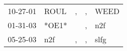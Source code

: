 \begin{supertabular}{lllll}
 10-27-01 &   ROUL &  , &  , &  WEED \\
 01-31-03 &  *OE1* &    &  , &   n2f \\
 05-25-03 &    n2f &  , &  , &  slfg \\
\end{supertabular}
